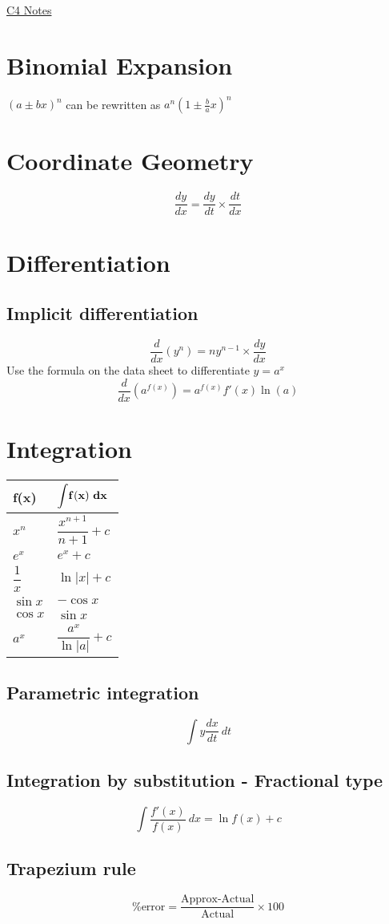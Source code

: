 \documentclass{article}[18pt]
\begin{document}
\begin{center}
\underline{\huge C4 Notes}
\end{center}
\section{Binomial Expansion}
$(a\pm bx)^n$ can be rewritten as $a^n(1\pm\frac{b}{a}x)^n$
\section{Coordinate Geometry}
$$\frac{dy}{dx}=\frac{dy}{dt}\times\frac{dt}{dx}$$
\section{Differentiation}
\subsection{Implicit differentiation}
$$\frac{d}{dx}(y^n)=ny^{n-1}\times\frac{dy}{dx}$$
Use the formula on the data sheet to differentiate $y=a^x$
$$\frac{d}{dx}(a^{f(x)})=a^{f(x)}f'(x)\ln(a)$$
\section{Integration}
{\renewcommand{\arraystretch}{2}
\begin{tabularx}{\textwidth}{|X|X|}
 \hline
 \textbf{f(x)} & $\mathbf{\mathlarger{\int} f(x)\ dx}$ \\
 \hline
 $x^n$  & $\dfrac{x^{n+1}}{n+1}+c$ \\
\hline
$e^x$&$e^x+c$\\
\hline
$\dfrac{1}{x}$&$\ln|x|+c$\\
\hline
$\sin x$&$-\cos x$\\
\hline
$\cos x$&$\sin x$\\
\hline
$a^x$&$\dfrac{a^x}{\ln|a|}+c$\\
\hline
\end{tabularx}
}
\subsection{Parametric integration}
$$\int y\frac{dx}{dt} \ dt$$
\subsection{Integration by substitution - Fractional type}
$$\int \frac{f'(x)}{f(x)} \ dx= \ln f(x)+c$$
\subsection{Trapezium rule}
$$\% \textrm{error}=\frac{\textrm{Approx-Actual}}{\textrm{Actual}}\times 100$$
\end{document}

